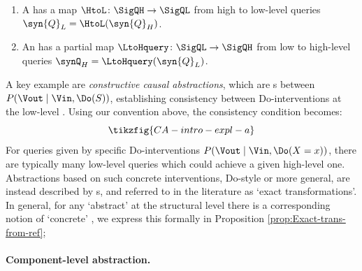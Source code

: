 \documentclass{article}
\begin{document}
\begin{enumerate}
\item 
A \emph{\qdownfull{}} has a map $\HtoL \colon \SigQH \to \SigQL$ from high to low-level queries $\syn{Q}_L = \HtoL(\syn{Q}_H)$.
\item 
An \emph{\qupfull{}} has a partial map $\LtoHquery \colon \SigQL \to \SigQH$ from low to high-level queries $\synQ_H = \LtoHquery(\syn{Q}_L)$. 
\end{enumerate}

A key example are \emph{constructive causal abstractions}, which are \qdownfull{}s between \  $P(\Vout \mid \Vin, \Do(S))$, establishing consistency between Do-interventions at the low-level 
.
Using our convention above, the consistency condition becomes: 
\[ 
\tikzfig{CA-intro-expl-a}
\] 
For queries given by specific Do-interventions $P(\Vout \mid \Vin, \Do(X=x))$, there are typically many low-level queries which could achieve a given high-level one. Abstractions based on such concrete interventions, Do-style or more general, are instead described by \qupfull{}s, and referred to in the literature as `exact transformations'. In general, for any `abstract' \qdownfull{} at the structural level there is a corresponding notion of `concrete' \qupfull{}, we express this formally in Proposition \ref{prop:Exact-trans-from-ref}; 



\paragraph{Component-level abstraction.}
\end{document}
